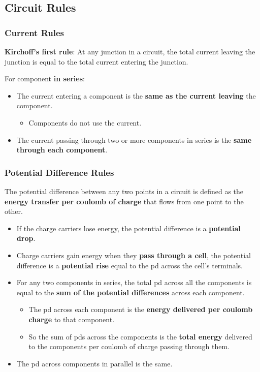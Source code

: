 \subsection{Circuit Rules}

\subsubsection*{Current Rules}

\textbf{Kirchoff's first rule}: At any junction in a circuit, the total current leaving the junction is equal to the total current entering the junction.

For component \textbf{in series}:

\begin{itemize}
    \item The current entering a component is the \textbf{same as the current leaving} the component.
        \begin{itemize}
            \item Components do not use the current.
        \end{itemize}
    \item The current passing through two or more components in series is the \textbf{same through each component}.
\end{itemize}

\subsubsection*{Potential Difference Rules}

The potential difference between any two points in a circuit is defined as the \textbf{energy transfer per coulomb of charge} that flows from one point to the other.

\begin{itemize}
    \item If the charge carriers lose energy, the potential difference is a \textbf{potential drop}.
    \item Charge carriers gain energy when they \textbf{pass through a cell}, the potential difference is a \textbf{potential rise} equal to the pd across the cell's terminals.
\end{itemize}

\begin{itemize}
    \item For any two components in series, the total pd across all the components is equal to the \textbf{sum of the potential differences} across each component.
        \begin{itemize}
            \item The pd across each component is the \textbf{energy delivered per coulomb charge} to that component.
            \item So the sum of pds across the components is the \textbf{total energy} delivered to the components per coulomb of charge passing through them.
        \end{itemize}
    \item The pd across components in parallel is the same.
\end{itemize}

